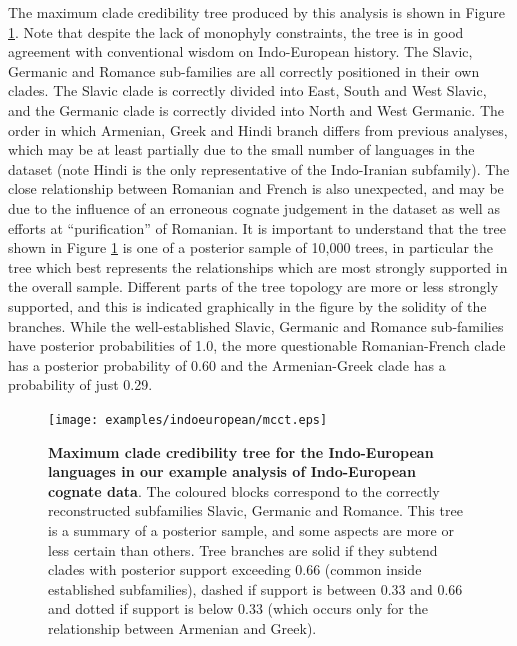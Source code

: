 \documentclass[10pt,a4paper]{article}
\begin{document}
The maximum clade credibility tree produced by this analysis is shown in Figure \ref{fig:ie}.  Note that despite the lack of monophyly constraints, the tree is in good agreement with conventional wisdom on Indo-European history.  The Slavic, Germanic and Romance sub-families are all correctly positioned in their own clades.  The Slavic clade is correctly divided into East, South and West Slavic, and the Germanic clade is correctly divided into North and West Germanic.  The order in which Armenian, Greek and Hindi branch differs from previous analyses\cite{Gray2003,Bouckaert2012}, which may be at least partially due to the small number of languages in the dataset (note Hindi is the only representative of the Indo-Iranian subfamily).  The close relationship between Romanian and French is also unexpected, and may be due to the influence of an erroneous cognate judgement in the dataset\cite{Geisler2010} as well as efforts at ``purification'' of Romanian\cite{Nelson-Sathi2010}.  It is important to understand that the tree shown in Figure \ref{fig:ie} is one of a posterior sample of 10,000 trees, in particular the tree which best represents the relationships which are most strongly supported in the overall sample.  Different parts of the tree topology are more or less strongly supported, and this is indicated graphically in the figure by the solidity of the branches.  While the well-established Slavic, Germanic and Romance sub-families have posterior probabilities of 1.0, the more questionable Romanian-French clade has a posterior probability of 0.60 and the Armenian-Greek clade has a probability of just 0.29.

\begin{figure}[t]
	\begin{center}
	\texttt{[image: examples/indoeuropean/mcct.eps]}
	\end{center}
	\caption{\textbf{Maximum clade credibility tree for the Indo-European languages in our example analysis of Indo-European cognate data}.  The coloured blocks correspond to the correctly reconstructed subfamilies Slavic, Germanic and Romance.  This tree is a summary of a posterior sample, and some aspects are more or less certain than others.  Tree branches are solid if they subtend clades with posterior support exceeding 0.66 (common inside established subfamilies), dashed if support is between 0.33 and 0.66 and dotted if support is below 0.33 (which occurs only for the relationship between Armenian and Greek).}
\label{fig:ie}
\end{figure}
\end{document}
